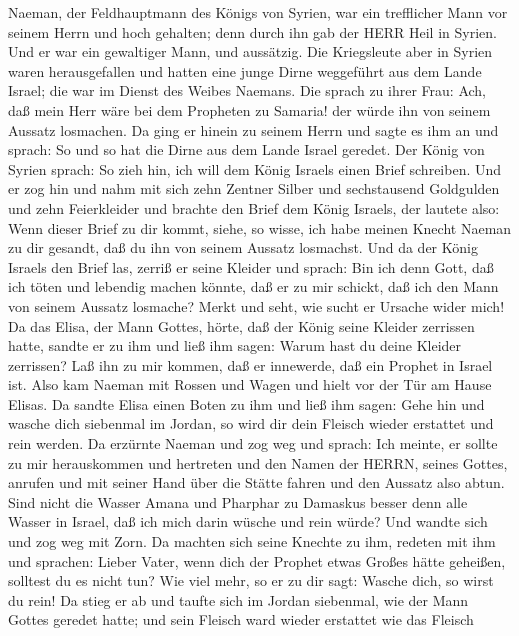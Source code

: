  Naeman, der Feldhauptmann des Königs von Syrien, war ein
trefflicher Mann vor seinem Herrn und hoch gehalten; denn durch ihn gab
der HERR Heil in Syrien. Und er war ein gewaltiger Mann, und aussätzig.
 Die Kriegsleute aber in Syrien waren herausgefallen und
hatten eine junge Dirne weggeführt aus dem Lande Israel; die war im
Dienst des Weibes Naemans.  Die sprach zu ihrer Frau: Ach,
daß mein Herr wäre bei dem Propheten zu Samaria! der würde ihn von
seinem Aussatz losmachen.  Da ging er hinein zu seinem Herrn
und sagte es ihm an und sprach: So und so hat die Dirne aus dem Lande
Israel geredet.  Der König von Syrien sprach: So zieh hin,
ich will dem König Israels einen Brief schreiben. Und er zog hin und
nahm mit sich zehn Zentner Silber und sechstausend Goldgulden und zehn
Feierkleider  und brachte den Brief dem König Israels, der
lautete also: Wenn dieser Brief zu dir kommt, siehe, so wisse, ich habe
meinen Knecht Naeman zu dir gesandt, daß du ihn von seinem Aussatz
losmachst.  Und da der König Israels den Brief las, zerriß
er seine Kleider und sprach: Bin ich denn Gott, daß ich töten und
lebendig machen könnte, daß er zu mir schickt, daß ich den Mann von
seinem Aussatz losmache? Merkt und seht, wie sucht er Ursache wider
mich!  Da das Elisa, der Mann Gottes, hörte, daß der König
seine Kleider zerrissen hatte, sandte er zu ihm und ließ ihm sagen:
Warum hast du deine Kleider zerrissen? Laß ihn zu mir kommen, daß er
innewerde, daß ein Prophet in Israel ist.  Also kam Naeman
mit Rossen und Wagen und hielt vor der Tür am Hause Elisas.
 Da sandte Elisa einen Boten zu ihm und ließ ihm sagen:
Gehe hin und wasche dich siebenmal im Jordan, so wird dir dein Fleisch
wieder erstattet und rein werden.  Da erzürnte Naeman und
zog weg und sprach: Ich meinte, er sollte zu mir herauskommen und
hertreten und den Namen der HERRN, seines Gottes, anrufen und mit seiner
Hand über die Stätte fahren und den Aussatz also abtun. 
Sind nicht die Wasser Amana und Pharphar zu Damaskus besser denn alle
Wasser in Israel, daß ich mich darin wüsche und rein würde? Und wandte
sich und zog weg mit Zorn.  Da machten sich seine Knechte
zu ihm, redeten mit ihm und sprachen: Lieber Vater, wenn dich der
Prophet etwas Großes hätte geheißen, solltest du es nicht tun? Wie viel
mehr, so er zu dir sagt: Wasche dich, so wirst du rein!  Da
stieg er ab und taufte sich im Jordan siebenmal, wie der Mann Gottes
geredet hatte; und sein Fleisch ward wieder erstattet wie das Fleisch
